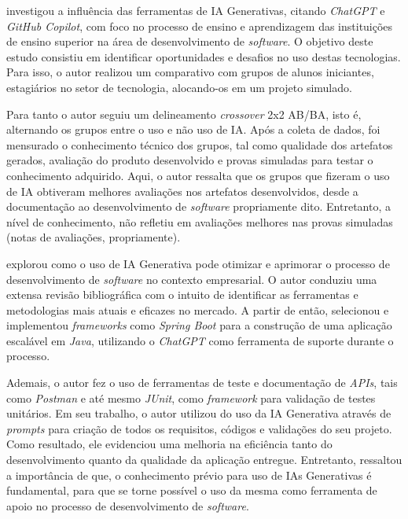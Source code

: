 \documentclass[english,brazilian]{UNISINOSartigo} %
\begin{document}
 investigou a influência das ferramentas de IA Generativas, citando \textit{ChatGPT} e \textit{GitHub Copilot}, com foco no processo de ensino e aprendizagem das instituições de ensino superior na área de desenvolvimento de \textit{software}. O objetivo deste estudo consistiu em identificar oportunidades e desafios no uso destas tecnologias. Para isso, o autor realizou um comparativo com grupos de alunos iniciantes, estagiários no setor de tecnologia, alocando-os em um projeto simulado.

Para tanto o autor \cite{santos2024} seguiu um delineamento \textit{crossover} 2x2 AB/BA, isto é, alternando os grupos entre o uso e não uso de IA. Após a coleta de dados, foi mensurado o conhecimento técnico dos grupos, tal como qualidade dos artefatos gerados, avaliação do produto desenvolvido e provas simuladas para testar o conhecimento adquirido. Aqui, o autor ressalta que os grupos que fizeram o uso de IA obtiveram melhores avaliações nos artefatos desenvolvidos, desde a documentação ao desenvolvimento de \textit{software} propriamente dito. Entretanto, a nível de conhecimento, não refletiu em avaliações melhores nas provas simuladas (notas de avaliações, propriamente).

 explorou como o uso de IA Generativa pode otimizar e aprimorar o processo de desenvolvimento de \textit{software} no contexto empresarial. O autor conduziu uma extensa revisão bibliográfica com o intuito de identificar as ferramentas e metodologias mais atuais e eficazes no mercado. A partir de então, selecionou e implementou \textit{frameworks} como \textit{Spring Boot} para a construção de uma aplicação escalável em \textit{Java}, utilizando o \textit{ChatGPT} como ferramenta de suporte durante o processo.

Ademais, o autor \cite{costa2024} fez o uso de ferramentas de teste e documentação de \textit{APIs}, tais como \textit{Postman} e até mesmo \textit{JUnit}, como \textit{framework} para validação de testes unitários. Em seu trabalho, o autor utilizou do uso da IA Generativa através de \textit{prompts} para criação de todos os requisitos, códigos e validações do seu projeto. Como resultado, ele evidenciou uma melhoria na eficiência tanto do desenvolvimento quanto da qualidade da aplicação entregue. Entretanto, ressaltou a importância de que, o conhecimento prévio para uso de IAs Generativas é fundamental, para que se torne possível o uso da mesma como ferramenta de apoio no processo de desenvolvimento de \textit{software}.
\end{document}
